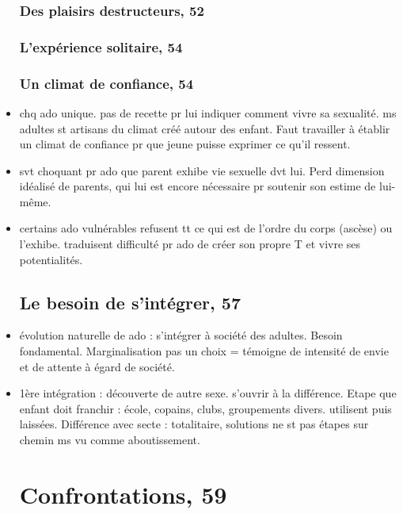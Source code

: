 \documentclass[12pt]{report}
\begin{document}
\begin{itemize}
\subsection{Des plaisirs destructeurs, 52}

\subsection{L'expérience solitaire, 54}
\subsection{Un climat de confiance, 54}

\item chq ado unique.  pas de recette pr lui indiquer comment vivre sa sexualité. ms adultes st artisans du climat créé autour des enfant. Faut travailler à établir un climat de confiance pr que jeune puisse exprimer ce qu'il ressent.\\

\item svt choquant pr ado que parent exhibe vie sexuelle dvt lui.  Perd dimension idéalisé de parents, qui lui est encore nécessaire pr soutenir son estime de lui-même.\\

\item certains ado vulnérables refusent tt ce qui est de l'ordre du corps (ascèse) ou l'exhibe. traduisent difficulté pr ado de créer son propre T et vivre ses potentialités.

\section{Le besoin de s'intégrer, 57}

\item évolution naturelle de ado : s'intégrer à société des adultes. Besoin fondamental. Marginalisation pas un choix = témoigne de intensité de envie et de attente à égard de société.\\

\item 1ère intégration : découverte de autre sexe. s'ouvrir à la différence. Etape que enfant doit franchir : école, copains, clubs, groupements divers. utilisent puis laissées. Différence avec secte : totalitaire, solutions ne st pas étapes sur chemin ms vu comme aboutissement.

\chapter{Confrontations, 59}


\end{itemize}
\end{document}
